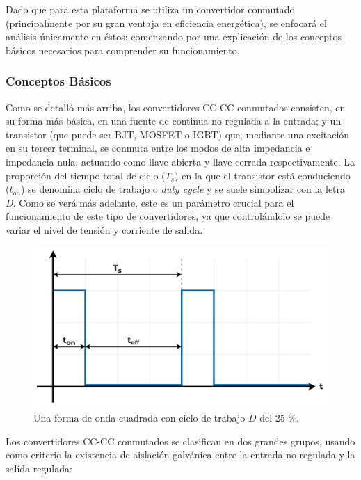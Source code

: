 Dado que para esta plataforma se utiliza un convertidor conmutado (principalmente por su gran ventaja en eficiencia energética), se enfocará el análisis únicamente en éstos; comenzando por una explicación de los conceptos básicos necesarios para comprender su funcionamiento.\\

\subsubsection{Conceptos Básicos}

Como se detalló más arriba, los convertidores CC-CC conmutados consisten, en su forma más básica, en una fuente de continua no regulada a la entrada; y un transistor (que puede ser BJT, MOSFET o IGBT) que, mediante una excitación en su tercer terminal, se conmuta entre los modos de alta impedancia e impedancia nula, actuando como llave abierta y llave cerrada respectivamente. La proporción del tiempo total de ciclo ($T_s$) en la que el transistor está conduciendo ($t_{on}$) se denomina {\Medium ciclo de trabajo} o {\Medium \textit{duty cycle}} y se suele simbolizar con la {\Medium letra \textit{D}}. Como se verá más adelante, este es un parámetro crucial para el funcionamiento de este tipo de convertidores, ya que controlándolo se puede variar el nivel de tensión y corriente de salida.\\

\begin{figure}[h]
    \centering
    \includegraphics[scale=0.5]{Imagenes/Duty Cycle.pdf}
    \caption{Una forma de onda cuadrada con ciclo de trabajo $D$ del 25 \%.}
    \label{dutycycle}
\end{figure}

Los convertidores CC-CC conmutados se clasifican en dos grandes grupos, usando como criterio la existencia de aislación galvánica entre la entrada no regulada y la salida regulada:


